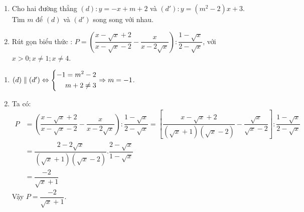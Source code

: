 \begin{ex}%
	\hfill
       \begin{enumerate}[1)]
        \item Cho hai đường thẳng $(d): y=-x+m+2$ và $(d'): y=(m^2-2)x+3$. Tìm $m$ để $(d)$ và $(d')$ song song với nhau.
        \item Rút gọn biểu thức : $P=\left(\dfrac{x-\sqrt{x}+2}{x-\sqrt{x}-2}-\dfrac{x}{x-2\sqrt{x}}\right):\dfrac{1-\sqrt{x}}{2-\sqrt{x}}$, với $x>0;x\neq 1;x\neq 4$.
    \end{enumerate}
\loigiai
    {
    \begin{enumerate}[1)]
        \item $(d)\parallel (d')\Leftrightarrow \left\{\begin{aligned}-1=m^2-2\\m+2\neq 3\end{aligned}\right.\Rightarrow m=-1$.
        \item Ta có: 
         \begin{align*}
       P&=\left(\dfrac{x-\sqrt{x}+2}{x-\sqrt{x}-2}-\dfrac{x}{x-2\sqrt{x}}\right):\dfrac{1-\sqrt{x}}{2-\sqrt{x}}     =\left[\dfrac{x-\sqrt{x}+2}{\left(\sqrt{x}+1\right)\left(\sqrt{x}-2\right)}-\dfrac{\sqrt{x}}{\sqrt{x}-2} \right]:\dfrac{1-\sqrt{x}}{2-\sqrt{x}}\\
       &=\dfrac{2-2\sqrt{x}}{\left(\sqrt{x}+1\right)\left(\sqrt{x}-2\right)}.\dfrac{2-\sqrt{x}}{1-\sqrt{x}}\\
       &=\dfrac{-2}{\sqrt{x}+1}
        \end{align*}   
        Vậy $P=\dfrac{-2}{\sqrt{x}+1}$.
    \end{enumerate}
    }
\end{ex}

